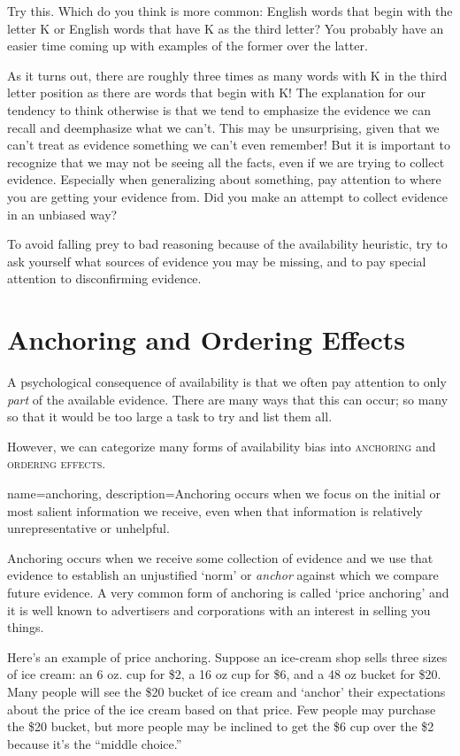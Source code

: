 Try this. Which do you think is more common: English words that begin with the letter K or English words that have K as the third letter? You probably have an easier time coming up with examples of the former over the latter.

As it turns out, there are roughly three times as many words with K in the third letter position as there are words that begin with K! The explanation for our tendency to think otherwise is that we tend to emphasize the evidence we can recall and deemphasize what we can't. This may be unsurprising, given that we can't treat as evidence something we can't even remember! But it is important to recognize that we may not be seeing all the facts, even if we are trying to collect evidence. Especially when generalizing about something, pay attention to where you are getting your evidence from. Did you make an attempt to collect evidence in an unbiased way?

To avoid falling prey to bad reasoning because of the availability heuristic, try to ask yourself what sources of evidence you may be missing, and to pay special attention to disconfirming evidence.

\section{Anchoring and Ordering Effects}

A psychological consequence of availability is that we often pay attention to only \emph{part} of the available evidence. There are many ways that this can occur; so many so that it would be too large a task to try and list them all.

However, we can categorize many forms of availability bias into \textsc{\gls{anchoring}} and \textsc{\gls{ordering effects}}.

{
name=anchoring,
description={Anchoring occurs when we focus on the initial or most salient information we receive, even when that information is relatively unrepresentative or unhelpful.}
}

Anchoring occurs when we receive some collection of evidence and we use that evidence to establish an unjustified `norm' or \emph{anchor} against which we compare future evidence. A very common form of anchoring is called `price anchoring' and it is well known to advertisers and corporations with an interest in selling you things.

Here's an example of price anchoring. Suppose an ice-cream shop sells three sizes of ice cream: an 6 oz. cup for \$2, a 16 oz cup for \$6, and a 48 oz bucket for \$20. Many people will see the \$20 bucket of ice cream and `anchor' their expectations about the price of the ice cream based on that price. Few people may purchase the \$20 bucket, but more people may be inclined to get the \$6 cup over the \$2 because it's the ``middle choice.''

